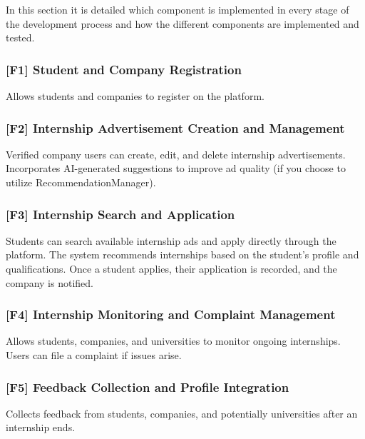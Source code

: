 In this section it is detailed which component is implemented in every stage of the
development process and how the different components are implemented and tested.

\subsubsection*{[F1] Student and Company Registration}
Allows students and companies to register on the platform.



\subsubsection*{[F2] Internship Advertisement Creation and Management}
Verified company users can create, edit, and delete internship advertisements.
Incorporates AI-generated suggestions to improve ad quality (if you choose to utilize RecommendationManager).

\subsubsection*{[F3] Internship Search and Application}
Students can search available internship ads and apply directly through the platform.
The system recommends internships based on the student’s profile and qualifications.
Once a student applies, their application is recorded, and the company is notified.

\subsubsection*{[F4] Internship Monitoring and Complaint Management}
Allows students, companies, and universities to monitor ongoing internships.
Users can file a complaint if issues arise.

\subsubsection*{[F5] Feedback Collection and Profile Integration}
Collects feedback from students, companies, and potentially universities after an internship ends.
